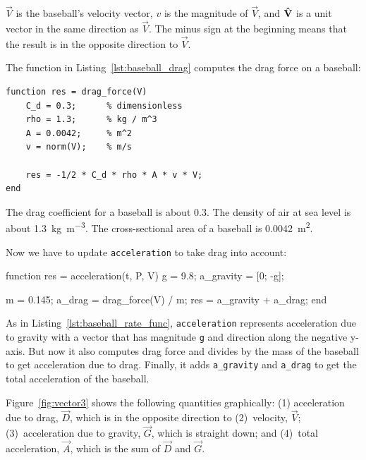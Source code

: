 
$\vec{V}$ is the baseball's velocity vector, $v$ is the magnitude of $\vec{V}$, and $\uvec{V}$ is a unit vector in the same direction as $\vec{V}$.  The minus sign at the beginning means that the result is in the opposite direction to $\vec{V}$.


The function in Listing~\ref{lst:baseball_drag} computes the drag force on a baseball:

\begin{lstlisting}[caption={A function that calculates the drag force on a baseball}, label={lst:baseball_drag}]
 function res = drag_force(V)
    C_d = 0.3;      % dimensionless
    rho = 1.3;      % kg / m^3
    A = 0.0042;     % m^2
    v = norm(V);    % m/s

    res = -1/2 * C_d * rho * A * v * V;
end
\end{lstlisting}
  
The drag coefficient for a baseball is about 0.3.  
The density of air at sea level is about \SI{1.3}{\kilogram\per\meter\cubed}.
The cross-sectional area of a baseball is \SI{0.0042}{\meter\squared}.


Now we have to update \lstinline{acceleration} to take drag into account:

\begin{code}
function res = acceleration(t, P, V)
    g = 9.8;                       %
    a_gravity = [0; -g];

    m = 0.145;                     %
    a_drag = drag_force(V) / m;
    res = a_gravity + a_drag;
end
\end{code}

As in Listing~\ref{lst:baseball_rate_func}, \lstinline{acceleration} represents acceleration due to gravity with a vector that has magnitude \lstinline{g} and direction along the negative y-axis.
But now it also computes drag force and divides by the mass of the baseball to get acceleration due to drag.
Finally, it adds \lstinline{a_gravity} and \lstinline{a_drag} to get the total acceleration of the baseball.


Figure~\ref{fig:vector3} shows the following quantities graphically:  (1) acceleration due to drag, $\vec{D}$, which is in the opposite direction to (2)~velocity, $\vec{V}$; (3)~acceleration due to gravity, $\vec{G}$, which is straight down; and (4)~total acceleration, $\vec{A}$, which is the sum of $\vec{D}$ and $\vec{G}$.

